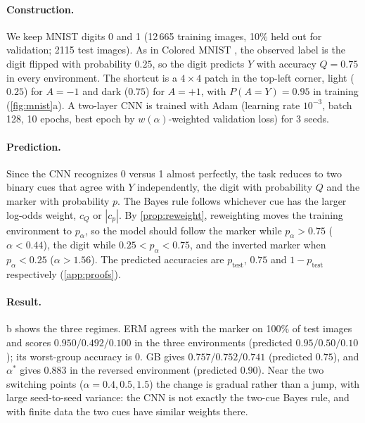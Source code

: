 \documentclass{article}
\begin{document}
\paragraph{Construction.} We keep MNIST digits 0 and 1 \cite{lecun1998mnist} (12\,665 training images,
10\% held out for validation; 2115 test images). As in Colored MNIST \cite{arjovsky2019irm}, the
observed label is the digit flipped with probability $0.25$, so the digit predicts $Y$ with accuracy
$Q=0.75$ in every environment. The shortcut is a $4\times4$ patch in the top-left corner, light
($0.25$) for $A=-1$ and dark ($0.75$) for $A=+1$, with $P(A=Y)=0.95$ in training
(\cref{fig:mnist}a). A two-layer CNN is trained with Adam (learning rate $10^{-3}$, batch 128,
10 epochs, best epoch by $w(\alpha)$-weighted validation loss) for 3 seeds.

\paragraph{Prediction.} Since the CNN recognizes 0 versus 1 almost perfectly, the task reduces to two
binary cues that agree with $Y$ independently, the digit with probability $Q$ and the marker with
probability $p$. The Bayes rule follows whichever cue has the larger log-odds weight, $c_Q$ or
$|c_p|$. By \cref{prop:reweight}, reweighting moves the training environment to $p_\alpha$, so the
model should follow the marker while $p_\alpha>0.75$ ($\alpha<0.44$), the digit while
$0.25<p_\alpha<0.75$, and the inverted marker when $p_\alpha<0.25$ ($\alpha>1.56$). The predicted
accuracies are $p_{\text{test}}$, $0.75$ and $1-p_{\text{test}}$ respectively (\cref{app:proofs}).

\paragraph{Result.} b shows the three regimes. ERM agrees with the marker on 100\% of
test images and scores $0.950/0.492/0.100$ in the three environments (predicted $0.95/0.50/0.10$);
its worst-group accuracy is 0. GB gives $0.757/0.752/0.741$ (predicted $0.75$), and $\alpha^*$ gives
$0.883$ in the reversed environment (predicted $0.90$). Near the two switching points
($\alpha=0.4, 0.5, 1.5$) the change is gradual rather than a jump, with large seed-to-seed variance:
the CNN is not exactly the two-cue Bayes rule, and with finite data the two cues have similar
weights there.
\end{document}
